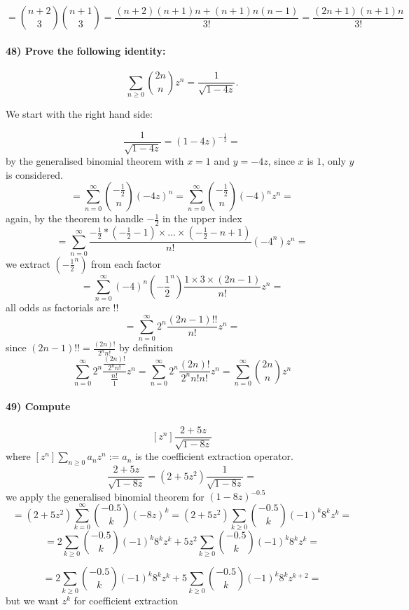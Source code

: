 \documentclass[
]{article}
\begin{document}
\[
= \binom{n+2}{3} \binom{n+1}{3} = \frac{(n+2)(n+1)n + (n+1)n(n-1)}{3!} = \frac{(2n+1)(n+1)n}{3!}
\]

\hypertarget{prove-the-following-identity}{%
\paragraph{48) Prove the following
identity:}\label{prove-the-following-identity}}

\[
\sum_{n \geq 0} \binom{2n}{n}z^n = \frac{1}{\sqrt{1-4z}}.
\]

We start with the right hand side:

\[
\frac{1}{\sqrt{1-4z}} = (1-4z)^{-\frac{1}{2}} = 
\] by the generalised binomial theorem with \(x = 1\) and \(y=-4z\),
since \(x\) is \(1\), only \(y\) is considered. \[
= \sum_{n=0}^{\infty} \binom{-\frac{1}{2}}{n} (-4z)^n = \sum_{n=0}^{\infty} \binom{-\frac{1}{2}}{n} (-4)^n z^n =
\] again, by the theorem to handle \(-\frac{1}{2}\) in the upper index
\[
= \sum_{n=0}^{\infty} \frac{-\frac{1}{2} * (-\frac{1}{2} - 1) \times \dots \times (-\frac{1}{2} - n +1)}{n!} (-4^n) z^n =
\] we extract \((-\frac{1}{2}^n)\) from each factor \[
= \sum_{n=0}^{\infty} (-4)^n (-\frac{1}{2}^n) \frac{1 \times 3 \times (2n - 1)}{n!} z^n = 
\] all odds as factorials are \(!!\) \[
= \sum_{n=0}^{\infty} 2^n \frac{(2n-1)!!}{n!} z^n = 
\] since \((2n-1)!! = \frac{(2n)!}{2^n n!}\) by definition \[
\sum_{n=0}^{\infty} 2^n \frac{\frac{(2n)!}{2^n n!}}{\frac{n!}{1}} z^n = \sum_{n=0}^{\infty} 2^n \frac{(2n)!}{2^n n! n!} z^n = \sum_{n=0}^{\infty} \binom{2n}{n} z^n
\]

\hypertarget{compute-1}{%
\paragraph{49) Compute}\label{compute-1}}

\[
[z^n] \frac{2+5z}{\sqrt{1-8z}}
\] where \([z^n]\sum_{n \geq 0} a_n z^n := a_n\) is the coefficient
extraction operator. \[
\frac{2+5z}{\sqrt{1-8z}} = (2+5z^2) \frac{1}{\sqrt{1-8z}} =
\] we apply the generalised binomial theorem for \((1-8z)^{-0.5}\) \[
= (2+5z^2) \sum_{k=0}^{\infty} \binom{-0.5}{k} (-8z)^k = (2+5z^2) \sum_{k\geq 0} \binom{-0.5}{k} (-1)^k 8^k z^k =
\] \[
= 2 \sum_{k\geq 0} \binom{-0.5}{k} (-1)^k 8^k z^k + 5z^2 \sum_{k\geq 0} \binom{-0.5}{k} (-1)^k 8^k z^k =
\]

\[
= 2 \sum_{k\geq 0} \binom{-0.5}{k} (-1)^k 8^k z^k + 5 \sum_{k\geq 0} \binom{-0.5}{k} (-1)^k 8^k z^{k+2} =
\] but we want \(z^k\) for coefficient extraction
\end{document}
